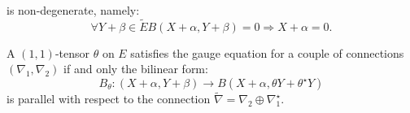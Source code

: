  is non-degenerate, namely:
 \begin{equation}
 \label{eq:non_degenerate_b}
 \forall Y+\beta \in \tilde{E} B\left( X + \alpha , Y + \beta \right) = 0 \Rightarrow X+\alpha = 0.
 \end{equation}
 \begin{prop}
 \label{prop:b_parallel}
 A $(1,1)$-tensor $\theta$ on $E$ satisfies the gauge equation for a couple of connections $\left( \nabla_1, \nabla_2\right)$ if and only the bilinear form:
 \begin{equation}
     \label{eq:bilinear_theta}
     B_\theta \colon \left(
     X+\alpha,Y+\beta
     \right) \to B\left(X + \alpha, \theta Y + \theta^\star 
     Y \right)
 \end{equation}
 is parallel with respect to the connection $\tilde{\nabla} = \nabla_2 \oplus \nabla_1^\star.$
 \end{prop}
